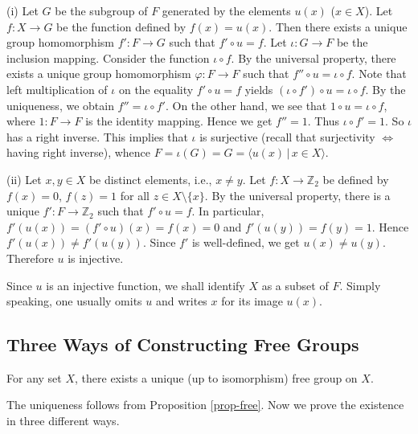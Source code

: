 \begin{sketch}
	(i) Let $G$ be the subgroup of $F$ generated by the elements $u(x)$ ($x\in X$). Let $f:X\rightarrow G$ be the function defined by $f(x) = u(x)$. Then there exists a unique group homomorphism $f':F\rightarrow G$ such that $f'\circ u = f$. Let $\iota:G\rightarrow F$ be the inclusion mapping. Consider the function $\iota\circ f$.  By the universal property, there exists a unique group homomorphism $\varphi:F\rightarrow F$ such that $f''\circ u = \iota\circ f$. Note that left multiplication of $\iota$ on the equality $f'\circ u = f$ yields $(\iota\circ f') \circ u = \iota\circ f$. By the uniqueness, we obtain $f'' =\iota\circ f'$. On the other hand, we see that $1\circ u = \iota\circ f$, where $1:F\rightarrow F$ is the identity mapping. Hence we get $f''= 1$. Thus $\iota\circ f' = 1$. So $\iota$ has a right inverse. This implies that $\iota$ is surjective (recall that surjectivity $\Leftrightarrow$ having right inverse), whence  $F = \iota(G) = G = \langle u(x)\,|\, x\in X\rangle$.
	
	(ii) Let $x,y\in X$ be distinct elements, i.e., $x\neq y$. Let $f:X\rightarrow \mathbb{Z}_2$ be defined by $f(x) = 0$, $f(z) = 1$ for all $z\in X\setminus\{x\}$. By the universal property, there is a unique $f':F\rightarrow \mathbb{Z}_2$ such that $f'\circ u = f$. In particular, $f'(u(x)) = (f'\circ u)(x) = f(x) = 0$ and $f'(u(y)) =  f(y) = 1$. Hence $f'(u(x)) \neq f'(u(y))$. Since $f'$ is well-defined, we get $u(x) \neq u(y)$. Therefore  $u$ is injective.
\end{sketch}
\begin{remark}
	Since $u$ is an injective function, we shall identify $X$ as a subset of $F$. Simply speaking, one usually omits $u$ and writes $x$ for its image $u(x)$. 
\end{remark}
\subsection{Three Ways of Constructing Free Groups}
\begin{theorem}
	For any set $X$, there exists a unique (up to isomorphism) free group on $X$.
\end{theorem}
The uniqueness follows from Proposition \ref{prop-free}. Now we prove the existence in three different ways.
